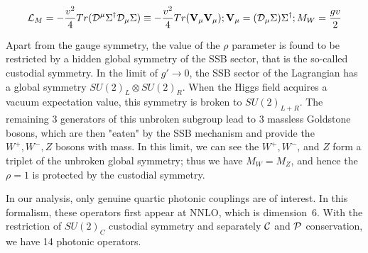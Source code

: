 \begin{equation}
{\cal L}_{M} = - \frac{v^2}{4} Tr({\cal D}^{\mu} \Sigma^{\dagger} {\cal D}_{\mu} \Sigma ) \equiv - \frac{v^2}{4} Tr( \mathbf{V}_{\mu} \mathbf{V}_{\mu} ) ; \mathbf{V}_{\mu} = ( {\cal D}_{\mu} \Sigma ) \Sigma^{\dagger} ; M_W = \frac{g v}{2}
\end{equation}

Apart from the gauge symmetry, the value of the $\rho$ parameter is
found to be restricted by a hidden global symmetry of the SSB sector,
that is the so-called custodial symmetry. In the limit of $g' \to 0$,
the SSB sector of the Lagrangian has a global symmetry $SU(2)_L
\otimes SU(2)_R$. When the Higgs field acquires a vacuum expectation
value, this symmetry is broken to $SU(2)_{L+R}$. The remaining 3
generators of this unbroken subgroup lead to 3 massless Goldstone
bosons, which are then "eaten" by the SSB mechanism and provide the
$W^+, W^-, Z$ bosons with mass. In this limit, we can see the $W^+,
W^-$, and $Z$ form a triplet of the unbroken global symmetry; thus we
have $M_W = M_Z$, and hence the $\rho = 1$ is protected by the
custodial symmetry.

In our analysis, only genuine quartic photonic couplings are of
interest. In this formalism, these operators first appear at NNLO,
which is dimension~6. With the restriction of $SU(2)_C$ custodial
symmetry and separately ${\cal C}$ and ${\cal P}$ conservation, we
have 14 photonic operators.

